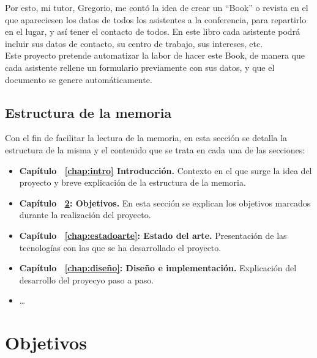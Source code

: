 \documentclass[a4paper, 12pt]{book}
\begin{document}
Por esto, mi tutor, Gregorio, me contó la idea de crear un ``Book'' o revista en el que apareciesen los datos de todos los asistentes a la conferencia, para repartirlo en el lugar, y así tener el contacto de todos. En este libro cada asistente podrá incluir sus datos de contacto, su centro de trabajo, sus intereses, etc.\\

Este proyecto pretende automatizar la labor de hacer este Book, de manera que cada asistente rellene un formulario previamente con sus datos, y que el documento se genere automáticamente.


\section{Estructura de la memoria}
\label{sec:estructura}

Con el fin de facilitar la lectura de la memoria, en esta sección se detalla la estructura de la misma y el contenido que se trata en cada una de las secciones:
\begin{itemize}
  \item \textbf{Capítulo ~\ref{chap:intro} Introducción.} Contexto en el que surge la idea del proyecto y breve explicación de la estructura de la memoria.

  \item \textbf{Capítulo ~\ref{chap:objetivos}: Objetivos.} En esta sección se explican los objetivos marcados durante la realización del proyecto.

  \item \textbf{Capítulo ~\ref{chap:estadoarte}: Estado del arte.} Presentación de las tecnologías con las que se ha desarrollado el proyecto.
  
  \item \textbf{Capítulo ~\ref{chap:diseño}: Diseño e implementación.} Explicación del desarrollo del proyecyo paso a paso.

  \item \ldots
\end{itemize}




\cleardoublepage %
\chapter{Objetivos} %
\label{chap:objetivos} %
\end{document}
